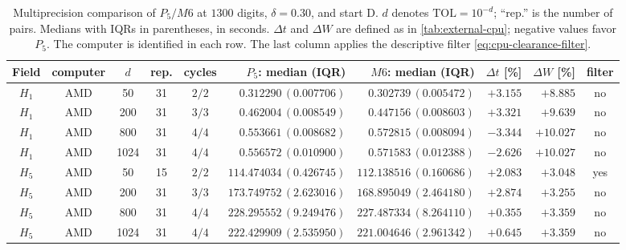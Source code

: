 \begin{table}[htbp]
\centering\scriptsize
\setlength{\tabcolsep}{3pt}
\caption{Multiprecision comparison of $P_5/M6$ at $1300$ digits, $\delta=0.30$, and start D. $d$ denotes $\mathrm{TOL}=10^{-d}$; ``rep.'' is the number of pairs. Medians with IQRs in parentheses, in seconds. $\Delta t$ and $\Delta W$ are defined as in \cref{tab:external-cpu}; negative values favor $P_5$. The computer is identified in each row. The last column applies the descriptive filter \eqref{eq:cpu-clearance-filter}.}
\label{tab:mp-external6}
\begin{tabular}{cccccrrrrc}
\toprule
Field & computer & $d$ & rep. & cycles & $P_5$: median (IQR) & $M6$: median (IQR) & $\Delta t$ [\%] & $\Delta W$ [\%] & filter\\
\midrule
$H_{1}$ & AMD & 50 & 31 & $2/2$ & $0.312290\,(0.007706)$ & $0.302739\,(0.005472)$ & $+3.155$ & $+8.885$ & no\\
$H_{1}$ & AMD & 200 & 31 & $3/3$ & $0.462004\,(0.008549)$ & $0.447156\,(0.008603)$ & $+3.321$ & $+9.639$ & no\\
$H_{1}$ & AMD & 800 & 31 & $4/4$ & $0.553661\,(0.008682)$ & $0.572815\,(0.008094)$ & $-3.344$ & $+10.027$ & no\\
$H_{1}$ & AMD & 1024 & 31 & $4/4$ & $0.556572\,(0.010900)$ & $0.571583\,(0.012388)$ & $-2.626$ & $+10.027$ & no\\
\midrule
$H_{5}$ & AMD & 50 & 15 & $2/2$ & $114.474034\,(0.426745)$ & $112.138516\,(0.160686)$ & $+2.083$ & $+3.048$ & yes\\
$H_{5}$ & AMD & 200 & 31 & $3/3$ & $173.749752\,(2.623016)$ & $168.895049\,(2.464180)$ & $+2.874$ & $+3.255$ & no\\
$H_{5}$ & AMD & 800 & 31 & $4/4$ & $228.295552\,(9.249476)$ & $227.487334\,(8.264110)$ & $+0.355$ & $+3.359$ & no\\
$H_{5}$ & AMD & 1024 & 31 & $4/4$ & $222.429909\,(2.535950)$ & $221.004646\,(2.961342)$ & $+0.645$ & $+3.359$ & no\\
\bottomrule
\end{tabular}
\end{table}
